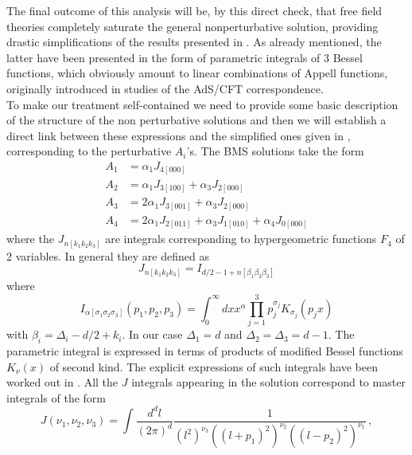 \documentclass[a4paper,11pt,openright,twoside]{book}
\numberwithin{equation}{section}
\begin{document}
{{The final outcome of this analysis will be, by this direct check, that free field theories 
completely saturate the general nonperturbative solution, providing  drastic simplifications of the results presented in \cite{Bzowski:2013sza}. As already mentioned, the latter have been presented in the form of parametric integrals of 3 Bessel functions, which obviously amount to linear combinations of Appell functions, originally introduced in studies of the AdS/CFT correspondence. \\
To make our treatment self-contained we need to provide some basic description of the structure 
of the non perturbative solutions and then we will establish a direct link between these expressions and the simplified ones given in \cite{Coriano:2018bbe}, corresponding to the perturbative $A_i$'s. 
The BMS solutions take the form 
\begin{equation}
	\begin{split}
		A_1 &=\alpha_1 J_{4[000]}  \\
		A_2 &= \alpha_1 J_{3[100]} +\alpha_3 J_{2[000]}\\
		A_3 &=2 \alpha_1 J_{3[001]} +\alpha_3 J_{2[000]} \\
		A_4 &=  2 \alpha_1 J_{2[011]} +\alpha_3 J_{1[010]} +\alpha_4 J_{0[000]} 
		\label{nonper}
	\end{split}
\end{equation}
where the $J_{n[k_1 k_2 k_3]}$ are integrals corresponding to hypergeometric functions $F_4$ of 2 variables. In general  they are defined as 
\begin{equation}
	J_{n[k_1 k_2 k_3]}=I_{d/2 -1 + n[\beta_1\beta_2\beta_3]}
	\label{tworel}
\end{equation}
where 
\begin{equation}
	I_{\alpha[\sigma_1\sigma_2\sigma_3]}(p_1,p_2,p_3)=\int_0^\infty dx x^\alpha \prod_{j=1}^3 p_j^{\sigma_j}K_{\sigma_j}(p_j x)
\end{equation}
with $\beta_i=\Delta_i -d/2 + k_i$. In our case $\Delta_1=d$ and $\Delta_2=\Delta_3=d-1$. 
The parametric integral is expressed in terms of products of modified Bessel functions $K_\nu(x)$ of second kind.  The explicit expressions of such integrals have been worked out in \cite{Bzowski:2013sza}. All the $J$ integrals appearing in the solution correspond to master integrals of the form \cite{Coriano:2013jba}
\begin{equation}
	\label{davy}
	J(\nu_1,\nu_2,\nu_3) = \int \frac{d^d l}{(2 \pi)^d} \frac{1}{(l^2)^{\nu_3} ((l+p_1)^2)^{\nu_2} ((l-p_2)^2)^{\nu_1}}\, ,

\end{equation}}}
\end{document}
